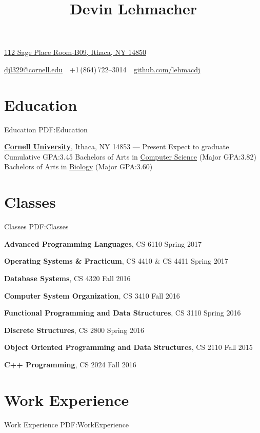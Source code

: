 \documentclass[letterpaper,10pt,oneside]{simpleresume}
\newcommand{\CVAuthor}{Devin Lehmacher}
\newcommand{\CVWebpage}{github.com/lehmacdj}
\begin{document}
\begin{minipage}[t][0pt]{\linewidth}
\pagestyle{empty}

\title{\CVAuthor}

\begin{subtitle}
\href{https://www.google.com/maps/place/112+Sage+Pl+Room-B09,+Ithaca,+NY+14850}
{112 Sage Place Room-B09, Ithaca, NY 14850}
\par
\href{mailto:djl329@cornell.edu}
{djl329@cornell.edu}
\,\SubBulletSymbol\,
+1\,(864)\,722--3014
\,\SubBulletSymbol\,
\href{https://\CVWebpage}
{\CVWebpage}
\end{subtitle}

\begin{body}

\section%
{Education}
{Education}
{PDF:Education}

\href{https://www.cornell.edu}
{\textbf{Cornell University}},
Ithaca, NY 14853
\hfill
{} --- Present
\BulletItem%
Expect to graduate 
\BulletItem%
Cumulative GPA:\@ 3.45
\BulletItem%
Bachelors of Arts in
\href{https://www.cs.cornell.edu}{Computer Science}
(Major GPA:\@ 3.82)
\BulletItem%
Bachelors of Arts in
\href{https://www.biology.cornell.edu}{Biology}
(Major GPA:\@ 3.60)

\section%
{Classes}
{Classes}
{PDF:Classes}

\textbf{Advanced Programming Languages}, CS 6110
\hfill Spring 2017

\textbf{Operating Systems \& Practicum}, CS 4410 \& CS 4411
\hfill Spring 2017

\textbf{Database Systems}, CS 4320
\hfill Fall 2016

\textbf{Computer System Organization}, CS 3410
\hfill Fall 2016

\textbf{Functional Programming and Data Structures}, CS 3110
\hfill Spring 2016

\textbf{Discrete Structures}, CS 2800
\hfill Spring 2016

\textbf{Object Oriented Programming and Data Structures}, CS 2110
\hfill Fall 2015

\textbf{C++ Programming}, CS 2024
\hfill Fall 2016

\section%
{Work Experience}
{Work Experience}
{PDF:WorkExperience}


\end{body}
\end{minipage}
\end{document}
